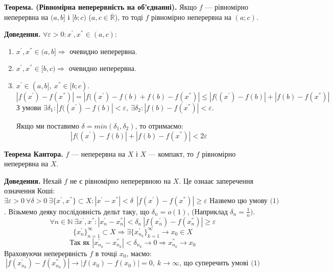 \documentclass[12pt]{report}
\begin{document}
\vspace{5mm}

\textbf{Теорема. (Рівномірна неперервність на об'єднанні).} Якщо $f$ --- рівномірно неперервна на $(a,b]$ і $[b;c)$ ($a, c \in \overline{\mathbb{R}}$), то тоді $f$ рівномірно неперервна на $(a;c)$.

\textbf{Доведення.} $\forall \varepsilon > 0 : x^{'}, x^{''} \in (a,c)$:

\begin{enumerate}
	\item $x^{'}, x^{''} \in (a,b] \Longrightarrow $ очевидно неперервна.
	\item $x^{'}, x^{''} \in [b,c) \Longrightarrow $ очевидно неперервна.
	\item $x^{'} \in (a, b], \ x^{''} \in [b;c).$
		$$|f(x^{'}) - f(x^{''})| = |f((x^{'}) -f(b) + f(b) - f(x^{''}) | \leq  |f((x^{'}) -f(b)|  + |f(b) - f(x^{''}) | $$
		З умови $ \exists \delta_1 :  |f((x^{'}) -f(b)| < \varepsilon,\ \exists \delta_2 :  |f(b) - f(x^{''}) | < \varepsilon$.
		
		Якщо ми поставимо $ \delta = min ( \delta_1, \delta_2)$, то отримаємо:
		$$ |f((x^{'}) -f(b)| + |f(b) - f(x^{''}) | < 2 \varepsilon $$
\end{enumerate}

\vspace{3mm}

\textbf{Теорема Кантора.} $f$ --- неперервна на $X$ і $X$ --- компакт, то $f$ рівномірно неперервна на $X$.

\textbf{Доведення.} Нехай $f$ не є рівномірно неперервною на $X$. Це ознаає заперечення означення Коші:
$$\exists \varepsilon > 0\ \forall \delta > 0\ \exists \{ x^{'},  x^{''}\} \subset X : | x^{'} -  x^{''}| < \delta \ \ |f( x^{'})  - f( x^{''}) | \geq \varepsilon \textrm{ Назвемо цю умову (1)}$$.
Візьмемо деяку послідовність дельт таку, що $\delta_n = o(1)$, (Наприклад $ \delta_n = \frac{1}{n}).$
$$\forall n\in \mathbb{N} \ \exists  x^{'},  x^{''} : | x^{'}_n -  x^{''}_n| < \delta_n\ |f( x^{'}_n) - f( x^{''}_n)| \geq \varepsilon $$
$$ \{x^{'}_n\}_{n=1}^{\infty} \subset X \Longrightarrow \exists \{x^{'}_{n_k}\}_{k=1}^{\infty} \to x_0 \in X$$
$$\textrm{Так як } | x^{'}_{n_k} -  x^{''}_{n_k} | < \delta_{n_k} \to 0 \Longrightarrow  x^{''}_{n_k} \to x_0$$
Враховуючи неперервність $f$ в точці $x_0$, маємо:
$$|f( x^{'}_{n_k}) - f( x^{''}_{n_k})| \to |f(x_0) - f(x_0)| = 0,\ k \to \infty \textrm{, що суперечить умові (1)}$$

\vspace{3mm}
\end{document}
